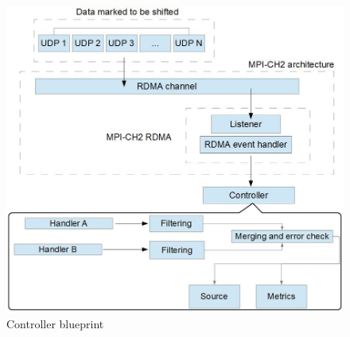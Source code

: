 \documentclass[11pt,openright,a4paper]{report}
\begin{document}
\begin{figure}
\centering
\includegraphics[width=1.0\linewidth]{picture/controllerBlueprint}
\caption{Controller blueprint}
\label{fig:controllerBlueprint}
\end{figure}
\end{document}
